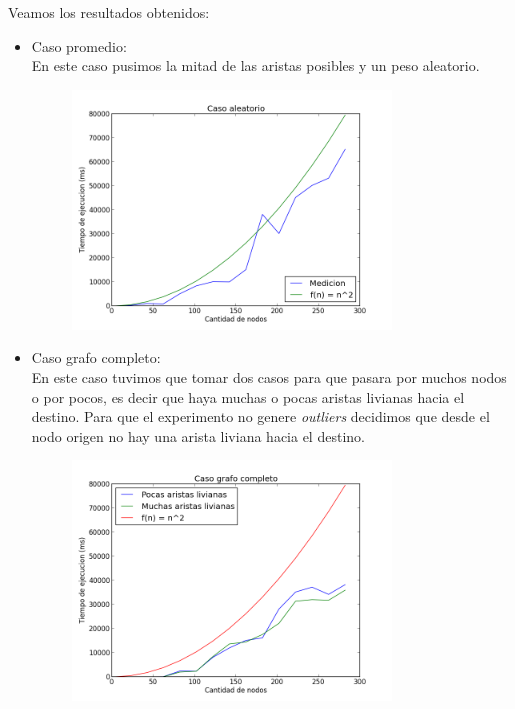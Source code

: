 Veamos los resultados obtenidos:
\begin{itemize}
    \item Caso promedio:\\
    En este caso pusimos la mitad de las aristas posibles y un peso aleatorio.
    \begin{figure}[H]
  \centering
  \includegraphics[width=0.8\textwidth]{Problema3/salida5}
  
  \label{fig: ej1_exp1_columnas}
\end{figure}
    \item Caso grafo completo:\\
    En este caso tuvimos que tomar dos casos para que pasara por muchos nodos o por pocos, es decir que haya muchas o pocas aristas livianas hacia el destino. Para que el experimento no genere \emph{outliers} decidimos que desde el nodo origen no hay una arista liviana hacia el destino.
    \begin{figure}[H]
  \centering
  \includegraphics[width=0.8\textwidth]{Problema3/salida6}


\end{figure}
\end{itemize}
